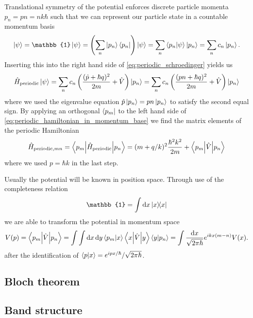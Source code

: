 Translational symmetry of the potential enforces discrete particle momenta
$p_n=pn=nk\hbar$ such that we can represent our particle state in a
countable momentum basis
\begin{equation}
  \ket{\psi}
  =\mathbb{1}\ket{\psi}
  =\left(\sum_n\ket{p_n}\bra{p_n}\right)\ket{\psi}
  =\sum_n\braket{p_n}{\psi}\ket{p_n}
  =\sum_nc_n\ket{p_n}
  \label{eq:countable_momentum_state}.
\end{equation}
Inserting this into the right hand side of \cref{eq:periodic_schroedinger}
yields us
\begin{equation}
  \hat{H}_\text{periodic}\ket{\psi}
  =\sum_nc_n\left(\frac{(\hat{p}+\hbar q)^2}{2m}+\hat{V}\right)\ket{p_n}
  =\sum_nc_n\left(\frac{(pn+\hbar q)^2}{2m}+\hat{V}\right)\ket{p_n}
  \label{eq:periodic_hamiltonian_in_momentum_base}
\end{equation}
where we used the eigenvalue equation $\hat{p}\ket{p_n}=pn\ket{p_n}$ to
satisfy the second equal sign. By applying an orthogonal $\bra{p_m}$ to the
left hand side of \cref{eq:periodic_hamiltonian_in_momentum_base} we find
the matrix elements of the periodic Hamiltonian
\begin{equation}
  \hat{H}_{\text{periodic},mn}
  =\mel**{p_m}{\hat{H}_\text{periodic}}{p_n}
  =(m+q/k)^2\frac{\hbar^2k^2}{2m}+\mel**{p_m}{\hat{V}}{p_n}
  \label{eq:periodic_hamiltonian_elements}
\end{equation}
where we used $p=\hbar k$ in the last step.

Usually the potential will be known in position space. Through use of the
completeness relation
\begin{equation}
  \mathbb{1}
  =\int\dd{x}\op{x}{x}
  \label{eq:continous_completeness_relation}
\end{equation}
we are able to transform the potential in momentum space
\begin{equation}
  V(p)
  =\mel**{p_m}{\hat{V}}{p_n}
  =\int\int\dd{x}\dd{y}\braket{p_m}{x}\mel**{x}{\hat{V}}{y}\braket{y}{p_n}
  =\int\frac{\dd{x}}{\sqrt{2\pi\hbar}}e^{ikx(m-n)}V(x)
  \label{eq:potential_fourier_transform}.
\end{equation}
after the identification of $\braket{p}{x}=e^{ipx/\hbar}/\sqrt{2\pi\hbar}$.

\subsection{Bloch theorem}

\subsection{Band structure}


